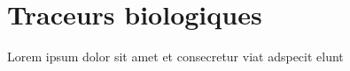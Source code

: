 \section{Traceurs biologiques}\label{sec:traceurs-biologiques}
   Lorem ipsum dolor sit amet et consecretur viat adspecit elunt